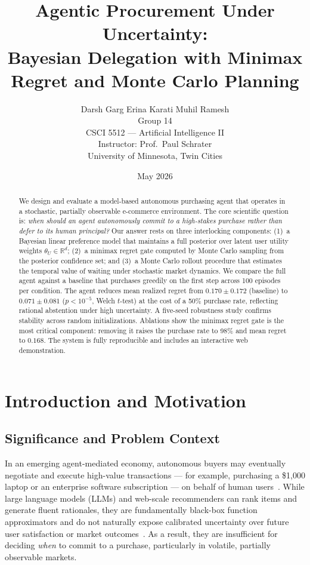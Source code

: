 \documentclass[11pt,letterpaper]{article}
\title{\textbf{Agentic Procurement Under Uncertainty:}\\[0.4em]
       \large Bayesian Delegation with Minimax Regret and Monte Carlo Planning}
\author{%
  Darsh Garg \quad Erina Karati \quad Muhil Ramesh\\[0.4em]
  {\normalsize Group 14}\\[0.4em]
  {\normalsize CSCI 5512 --- Artificial Intelligence II}\\
  {\normalsize Instructor: Prof.\ Paul Schrater}\\
  {\normalsize University of Minnesota, Twin Cities}%
}
\date{May 2026}
\newcommand{\thetaU}{\theta_U}
\begin{document}
\maketitle

\begin{abstract}
We design and evaluate a model-based autonomous purchasing agent that operates in a stochastic, partially observable e-commerce environment.  The core scientific question is: \emph{when should an agent autonomously commit to a high-stakes purchase rather than defer to its human principal?}  Our answer rests on three interlocking components: (1)~a Bayesian linear preference model that maintains a full posterior over latent user utility weights $\thetaU \in \mathbb{R}^d$; (2)~a minimax regret gate computed by Monte Carlo sampling from the posterior confidence set; and (3)~a Monte Carlo rollout procedure that estimates the temporal value of waiting under stochastic market dynamics.  We compare the full agent against a baseline that purchases greedily on the first step across 100 episodes per condition.  The agent reduces mean realized regret from $0.170 \pm 0.172$ (baseline) to $0.071 \pm 0.081$ ($p < 10^{-5}$, Welch $t$-test) at the cost of a 50\% purchase rate, reflecting rational abstention under high uncertainty.  A five-seed robustness study confirms stability across random initializations.  Ablations show the minimax regret gate is the most critical component: removing it raises the purchase rate to 98\% and mean regret to $0.168$.  The system is fully reproducible and includes an interactive web demonstration.
\end{abstract}

\section{Introduction and Motivation}
\label{sec:intro}

\subsection{Significance and Problem Context}

In an emerging agent-mediated economy, autonomous buyers may eventually negotiate and execute high-value transactions --- for example, purchasing a \$1{,}000 laptop or an enterprise software subscription --- on behalf of human users~\citep{yao2022webshop}.  While large language models (LLMs) and web-scale recommenders can rank items and generate fluent rationales, they are fundamentally black-box function approximators and do not naturally expose calibrated uncertainty over future user satisfaction or market outcomes~\citep{charpentier2022disentangling}.  As a result, they are insufficient for deciding \emph{when} to commit to a purchase, particularly in volatile, partially observable markets.
\end{document}
